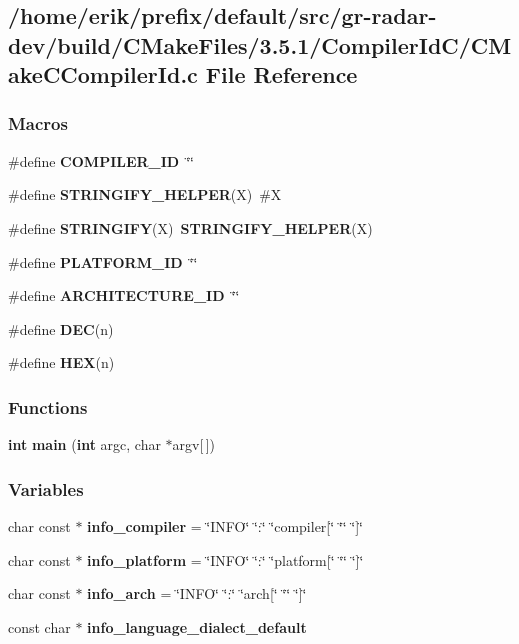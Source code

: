 \subsection{/home/erik/prefix/default/src/gr-\/radar-\/dev/build/\+C\+Make\+Files/3.5.1/\+Compiler\+Id\+C/\+C\+Make\+C\+Compiler\+Id.c File Reference}
\label{gr-radar-dev_2build_2CMakeFiles_23_85_81_2CompilerIdC_2CMakeCCompilerId_8c}
\subsubsection*{Macros}
\begin{DoxyCompactItemize}
\item 
\#define {\bf C\+O\+M\+P\+I\+L\+E\+R\+\_\+\+ID}~\char`\"{}\char`\"{}
\item 
\#define {\bf S\+T\+R\+I\+N\+G\+I\+F\+Y\+\_\+\+H\+E\+L\+P\+ER}(X)~\#X
\item 
\#define {\bf S\+T\+R\+I\+N\+G\+I\+FY}(X)~{\bf S\+T\+R\+I\+N\+G\+I\+F\+Y\+\_\+\+H\+E\+L\+P\+ER}(X)
\item 
\#define {\bf P\+L\+A\+T\+F\+O\+R\+M\+\_\+\+ID}~\char`\"{}\char`\"{}
\item 
\#define {\bf A\+R\+C\+H\+I\+T\+E\+C\+T\+U\+R\+E\+\_\+\+ID}~\char`\"{}\char`\"{}
\item 
\#define {\bf D\+EC}(n)
\item 
\#define {\bf H\+EX}(n)
\end{DoxyCompactItemize}
\subsubsection*{Functions}
\begin{DoxyCompactItemize}
\item 
{\bf int} {\bf main} ({\bf int} argc, char $\ast$argv[$\,$])
\end{DoxyCompactItemize}
\subsubsection*{Variables}
\begin{DoxyCompactItemize}
\item 
char const $\ast$ {\bf info\+\_\+compiler} = \char`\"{}I\+N\+FO\char`\"{} \char`\"{}\+:\char`\"{} \char`\"{}compiler[\char`\"{} \char`\"{}\char`\"{} \char`\"{}]\char`\"{}
\item 
char const $\ast$ {\bf info\+\_\+platform} = \char`\"{}I\+N\+FO\char`\"{} \char`\"{}\+:\char`\"{} \char`\"{}platform[\char`\"{} \char`\"{}\char`\"{} \char`\"{}]\char`\"{}
\item 
char const $\ast$ {\bf info\+\_\+arch} = \char`\"{}I\+N\+FO\char`\"{} \char`\"{}\+:\char`\"{} \char`\"{}arch[\char`\"{} \char`\"{}\char`\"{} \char`\"{}]\char`\"{}
\item 
const char $\ast$ {\bf info\+\_\+language\+\_\+dialect\+\_\+default}
\end{DoxyCompactItemize}


